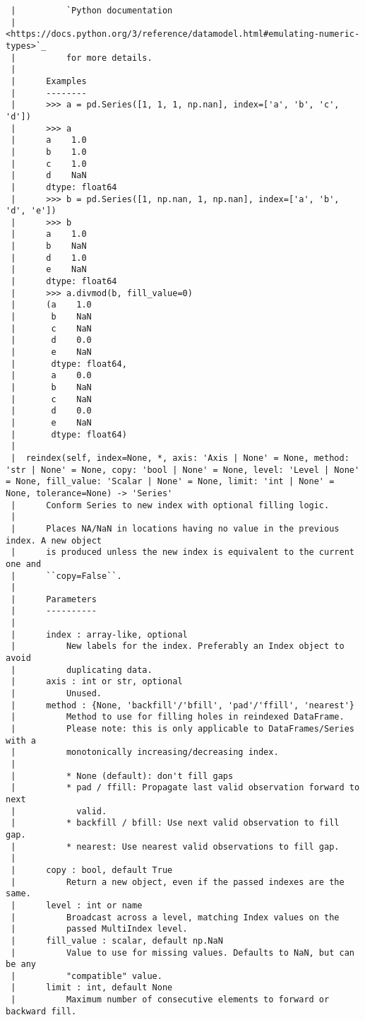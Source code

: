 \documentclass[
  letterpaper,
  DIV=11,
  numbers=noendperiod]{scrreprt}
\begin{document}
\begin{verbatim}
 |          `Python documentation
 |          <https://docs.python.org/3/reference/datamodel.html#emulating-numeric-types>`_
 |          for more details.
 |      
 |      Examples
 |      --------
 |      >>> a = pd.Series([1, 1, 1, np.nan], index=['a', 'b', 'c', 'd'])
 |      >>> a
 |      a    1.0
 |      b    1.0
 |      c    1.0
 |      d    NaN
 |      dtype: float64
 |      >>> b = pd.Series([1, np.nan, 1, np.nan], index=['a', 'b', 'd', 'e'])
 |      >>> b
 |      a    1.0
 |      b    NaN
 |      d    1.0
 |      e    NaN
 |      dtype: float64
 |      >>> a.divmod(b, fill_value=0)
 |      (a    1.0
 |       b    NaN
 |       c    NaN
 |       d    0.0
 |       e    NaN
 |       dtype: float64,
 |       a    0.0
 |       b    NaN
 |       c    NaN
 |       d    0.0
 |       e    NaN
 |       dtype: float64)
 |  
 |  reindex(self, index=None, *, axis: 'Axis | None' = None, method: 'str | None' = None, copy: 'bool | None' = None, level: 'Level | None' = None, fill_value: 'Scalar | None' = None, limit: 'int | None' = None, tolerance=None) -> 'Series'
 |      Conform Series to new index with optional filling logic.
 |      
 |      Places NA/NaN in locations having no value in the previous index. A new object
 |      is produced unless the new index is equivalent to the current one and
 |      ``copy=False``.
 |      
 |      Parameters
 |      ----------
 |      
 |      index : array-like, optional
 |          New labels for the index. Preferably an Index object to avoid
 |          duplicating data.
 |      axis : int or str, optional
 |          Unused.
 |      method : {None, 'backfill'/'bfill', 'pad'/'ffill', 'nearest'}
 |          Method to use for filling holes in reindexed DataFrame.
 |          Please note: this is only applicable to DataFrames/Series with a
 |          monotonically increasing/decreasing index.
 |      
 |          * None (default): don't fill gaps
 |          * pad / ffill: Propagate last valid observation forward to next
 |            valid.
 |          * backfill / bfill: Use next valid observation to fill gap.
 |          * nearest: Use nearest valid observations to fill gap.
 |      
 |      copy : bool, default True
 |          Return a new object, even if the passed indexes are the same.
 |      level : int or name
 |          Broadcast across a level, matching Index values on the
 |          passed MultiIndex level.
 |      fill_value : scalar, default np.NaN
 |          Value to use for missing values. Defaults to NaN, but can be any
 |          "compatible" value.
 |      limit : int, default None
 |          Maximum number of consecutive elements to forward or backward fill.

\end{verbatim}
\end{document}
